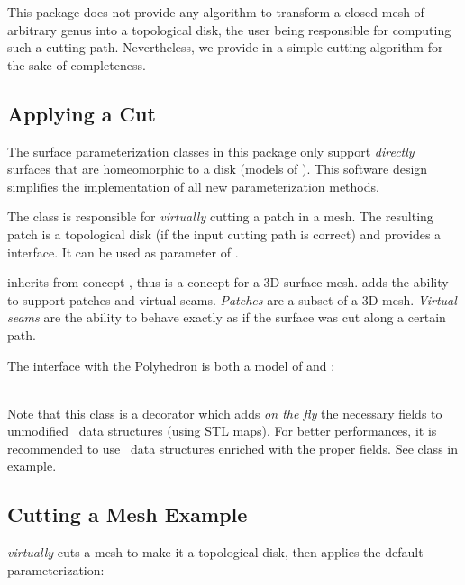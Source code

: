 This package does not provide any algorithm to transform a closed mesh
of arbitrary genus into a topological disk, the user being responsible
for computing such a cutting path. Nevertheless, we provide in
 a simple cutting algorithm for
the sake of completeness.


\subsection{Applying a Cut}

The surface parameterization classes in this package only support
\emph{directly} surfaces that are homeomorphic to a disk (models of
). This software design simplifies the
implementation of all new parameterization methods.

The 
class is responsible for \emph{virtually} cutting
a patch in a  mesh.
The resulting patch is a topological
disk (if the input cutting path is correct)
and provides a  interface. It can be used as
parameter of .

 inherits from concept ,
thus is a concept for a 3D surface mesh.
 adds the ability to support patches and
virtual seams. \emph{Patches} are a subset of a 3D mesh.
\emph{Virtual seams} are the ability
to behave exactly as if the surface was cut along a certain path.

The  interface with the Polyhedron is both a model of
 and :

  \\

Note that this class is a decorator which adds {\em on the fly}
the necessary fields to unmodified \cgal\ data structures (using STL
maps). For better performances, it is recommended to use \cgal\ data
structures enriched with the proper fields. See 
class in  example.


\subsection{Cutting a Mesh Example}

 \emph{virtually} cuts a
 mesh
to make it a topological disk, then applies the default parameterization:


